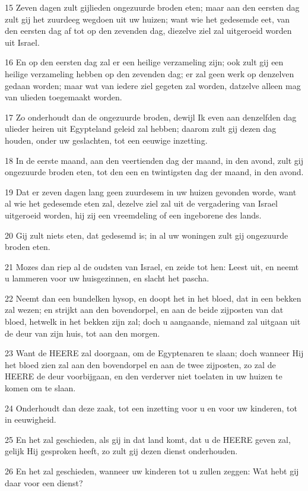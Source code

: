 \par 15 Zeven dagen zult gijlieden ongezuurde broden eten; maar aan den eersten dag zult gij het zuurdeeg wegdoen uit uw huizen; want wie het gedesemde eet, van den eersten dag af tot op den zevenden dag, diezelve ziel zal uitgeroeid worden uit Israel.
\par 16 En op den eersten dag zal er een heilige verzameling zijn; ook zult gij een heilige verzameling hebben op den zevenden dag; er zal geen werk op denzelven gedaan worden; maar wat van iedere ziel gegeten zal worden, datzelve alleen mag van ulieden toegemaakt worden.
\par 17 Zo onderhoudt dan de ongezuurde broden, dewijl Ik even aan denzelfden dag ulieder heiren uit Egypteland geleid zal hebben; daarom zult gij dezen dag houden, onder uw geslachten, tot een eeuwige inzetting.
\par 18 In de eerste maand, aan den veertienden dag der maand, in den avond, zult gij ongezuurde broden eten, tot den een en twintigsten dag der maand, in den avond.
\par 19 Dat er zeven dagen lang geen zuurdesem in uw huizen gevonden worde, want al wie het gedesemde eten zal, dezelve ziel zal uit de vergadering van Israel uitgeroeid worden, hij zij een vreemdeling of een ingeborene des lands.
\par 20 Gij zult niets eten, dat gedesemd is; in al uw woningen zult gij ongezuurde broden eten.
\par 21 Mozes dan riep al de oudsten van Israel, en zeide tot hen: Leest uit, en neemt u lammeren voor uw huisgezinnen, en slacht het pascha.
\par 22 Neemt dan een bundelken hysop, en doopt het in het bloed, dat in een bekken zal wezen; en strijkt aan den bovendorpel, en aan de beide zijposten van dat bloed, hetwelk in het bekken zijn zal; doch u aangaande, niemand zal uitgaan uit de deur van zijn huis, tot aan den morgen.
\par 23 Want de HEERE zal doorgaan, om de Egyptenaren te slaan; doch wanneer Hij het bloed zien zal aan den bovendorpel en aan de twee zijposten, zo zal de HEERE de deur voorbijgaan, en den verderver niet toelaten in uw huizen te komen om te slaan.
\par 24 Onderhoudt dan deze zaak, tot een inzetting voor u en voor uw kinderen, tot in eeuwigheid.
\par 25 En het zal geschieden, als gij in dat land komt, dat u de HEERE geven zal, gelijk Hij gesproken heeft, zo zult gij dezen dienst onderhouden.
\par 26 En het zal geschieden, wanneer uw kinderen tot u zullen zeggen: Wat hebt gij daar voor een dienst?
